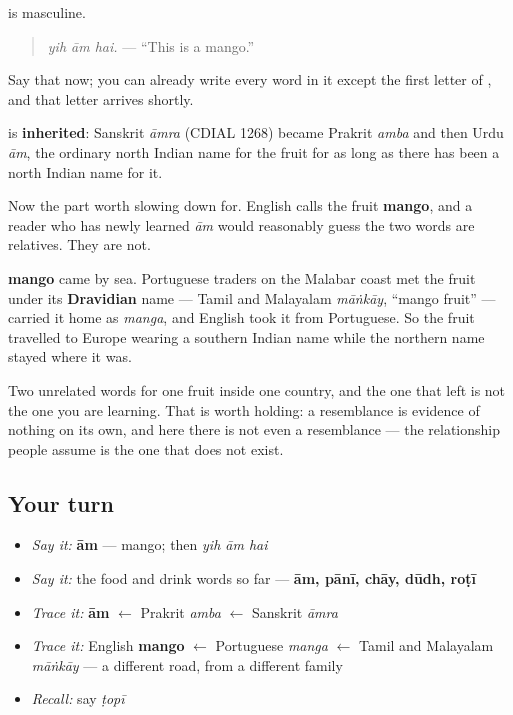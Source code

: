 \textbf{} is masculine.

\begin{quote}
\emph{yih ām hai.} — \textquotedblleft{}This is a mango.\textquotedblright{}
\end{quote}

Say that now; you can already write every word in it except the first letter of \textbf{}, and that letter arrives shortly.

\begin{cousinweb}
\textbf{} is \textbf{inherited}: Sanskrit \emph{āmra} (CDIAL 1268) became Prakrit \emph{amba} and then Urdu \emph{ām}, the ordinary north Indian name for the fruit for as long as there has been a north Indian name for it.

Now the part worth slowing down for. English calls the fruit \textbf{mango}, and a reader who has newly learned \emph{ām} would reasonably guess the two words are relatives. They are not.

\textbf{mango} came by sea. Portuguese traders on the Malabar coast met the fruit under its \textbf{Dravidian} name — Tamil and Malayalam \emph{māṅkāy}, \textquotedblleft{}mango fruit\textquotedblright{} — carried it home as \emph{manga}, and English took it from Portuguese. So the fruit travelled to Europe wearing a southern Indian name while the northern name stayed where it was.

Two unrelated words for one fruit inside one country, and the one that left is not the one you are learning. That is worth holding: a resemblance is evidence of nothing on its own, and here there is not even a resemblance — the relationship people assume is the one that does not exist.
\end{cousinweb}

\subsection*{Your turn}
\begin{itemize}
\raggedright
  \item \emph{Say it:} \textbf{ām} — mango; then \emph{yih ām hai}
  \item \emph{Say it:} the food and drink words so far — \textbf{ām, pānī, chāy, dūdh, roṭī}
  \item \emph{Trace it:} \textbf{ām} $\leftarrow$ Prakrit \emph{amba} $\leftarrow$ Sanskrit \emph{āmra}
  \item \emph{Trace it:} English \textbf{mango} $\leftarrow$ Portuguese \emph{manga} $\leftarrow$ Tamil and Malayalam \emph{māṅkāy} — a different road, from a different family
  \item \emph{Recall:} say \emph{ṭopī}
\end{itemize}

